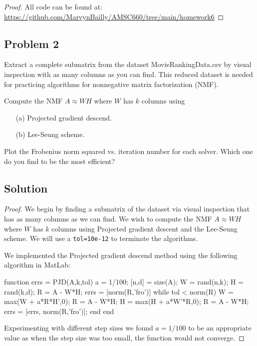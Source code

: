 \documentclass[12pt]{report}
\begin{document}
\begin{problem}
\begin{proof}
\noindent
All code can be found at: \url{https://github.com/MarvynBailly/AMSC660/tree/main/homework6}



\end{proof}
\end{problem}






\begin{problem}%
\subsection*{Problem 2}

Extract a complete submatrix from the dataset MovieRankingData.csv by visual inspection with as many columns as you can find. This reduced dataset is needed for practicing algorithms for nonnegative matrix factorization (NMF).

\noindent
Compute the NMF $A \approx WH$ where $W$ has $k$ columns using
\begin{enumerate}
    \item [(a)] Projected gradient descend.
    \item [(b)] Lee-Seung scheme.
\end{enumerate}
Plot the Frobenius norm squared vs. iteration number for each solver. Which one do you find to be the most efficient?


\subsection*{Solution}
\begin{proof}

We begin by finding a submatrix of the dataset via visual inspection that has as many columns as we can find. We wish to compute the NMF $A \approx WH$ where $W$ has $k$ columns using Projected gradient descent and the Lee-Seung scheme. We will use a \verb+tol=10e-12+ to terminate the algorithms.

\noindent
We implemented the Projected gradient descend method using the following algorithm in MatLab:
\begin{python}
function errs = PJD(A,k,tol)
    a = 1/100;
    [n,d] = size(A);
    W = rand(n,k);
    H = rand(k,d);
    R = A - W*H;
    errs = [norm(R,'fro')]
    while tol < norm(R)
        W = max(W + a*R*H',0);
        R = A - W*H;
        H = max(H + a*W'*R,0);
        R = A - W*H;
        errs = [errs, norm(R,'fro')];
    end
end
\end{python}
Experimenting with different step sizes we found $a=1/100$ to be an appropriate value as when the step size was too small, the function would not converge.


\end{proof}
\end{problem}
\end{document}
